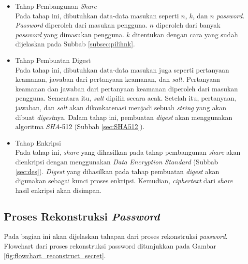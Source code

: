 \begin{itemize}
	\item Tahap Pembangunan \textit{Share} \\
	Pada tahap ini, dibutuhkan data-data masukan seperti $n$, $k$, dan $n$ \textit{password}. \textit{Password} diperoleh dari masukan pengguna. $n$ diperoleh dari banyak \textit{password} yang dimasukan pengguna. $k$ ditentukan dengan cara yang sudah dijelaskan pada Subbab \ref{subsec:pilihnk}.
	\item Tahap Pembuatan Digest \\
	Pada tahap ini, dibutuhkan data-data masukan juga seperti pertanyaan keamanan, jawaban dari pertanyaan keamanan, dan \textit{salt}. Pertanyaan keamanan dan jawaban dari pertanyaan keamanan diperoleh dari masukan pengguna. Sementara itu, \textit{salt} dipilih secara acak. Setelah itu, pertanyaan, jawaban, dan \textit{salt} akan dikonkatenasi menjadi sebuah \textit{string} yang akan dibuat \textit{digest}nya. Dalam tahap ini, pembuatan \textit{digest} akan menggunakan algoritma \textit{SHA}-512 (Subbab \ref{sec:SHA512}).
	\item Tahap Enkripsi \\
	Pada tahap ini, \textit{share} yang dihasilkan pada tahap pembangunan \textit{share} akan dienkripsi dengan menggunakan \textit{Data Encryption Standard} (Subbab \ref{sec:des}). \textit{Digest} yang dihasilkan pada tahap pembuatan \textit{digest} akan digunakan sebagai kunci proses enkripsi. Kemudian, \textit{ciphertext} dari \textit{share} hasil enkripsi akan disimpan.
\end{itemize}

\subsection{Proses Rekonstruksi \textit{Password}}

Pada bagian ini akan dijelaskan tahapan dari proses rekonstruksi \textit{password}. Flowchart dari proses rekonstruksi password ditunjukkan pada Gambar \ref{fig:flowchart_reconstruct_secret}.

